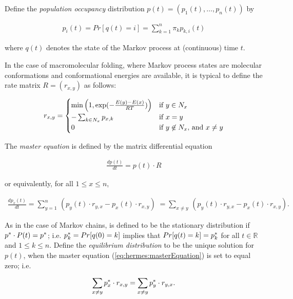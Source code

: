 Define the {\em population occupancy} distribution
$p(t) = (p_1(t),\dots,p_n(t))$ by

\begin{align}
\label{eq:hermes:markovProcessPopulationFreq}
p_i(t) = Pr[q(t) = i] = \sum_{k=1}^n\pi_k p_{k,i}(t)
\end{align}

where $q(t)$ denotes the state of the Markov process
at (continuous) time $t$.

In the case of macromolecular folding, where Markov process states
are molecular conformations and conformational energies are available,
it is typical to define the rate matrix
$R = (r_{x,y})$ as follows:

\begin{align}
\label{eq:hermes:eqXitionRate}
r_{x,y} =
\begin{cases}
\min\left( 1, \boltzYmX \right)
& \text{if $y \in N_x$} \\
-\sum_{k \in N_x} p_{x,k} & \text{if $x=y$} \\
0 & \text{if $y \not\in N_x$, and $x \ne y$} \\
\end{cases}
\end{align}

The {\em master equation} is defined by the matrix differential equation

\begin{align}
\label{eq:hermes:masterEquationMatrix}
\frac{d p(t)}{dt} = p(t) \cdot R
\end{align}

or equivalently, for all $1 \leq x \leq n$,

\begin{align}
\label{eq:hermes:masterEquation}
\frac{d p_x(t)}{dt} = \sum_{y=1}^n\, (p_y(t) \cdot r_{y,x} - p_x(t) \cdot
r_{x,y})\; = \sum_{x \ne y}\, (p_y(t) \cdot r_{y,x} - p_x(t) \cdot r_{x,y}).
\end{align}

As in the case of Markov chains,
\statDist is defined to be
the stationary distribution if
$p^* \cdot P(t)= p^*$; i.e. $p^*_k = Pr[ q(0) = k ]$ implies that
$Pr[ q(t) = k] = p^*_k$ for all $t \in \mathbb{R}$ and
$1 \leq k \leq n$.
Define the {\em equilibrium distribution} \statDist
to be the unique solution for $p(t)$, when the master equation
(\ref{eq:hermes:masterEquation}) is set to equal zero; i.e.

\begin{align}
\label{eq:hermes:equilibriumTime}
\sum_{x \ne y} \pSt_x \cdot r_{x,y} = \sum_{x \ne y} \pSt_y \cdot r_{y,x}.
\end{align}

